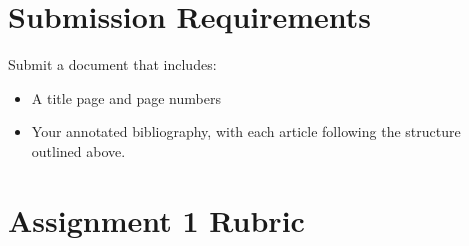 \documentclass[
  letterpaper,
  DIV=11,
  numbers=noendperiod]{scrreprt}
\providecommand{\tightlist}{%
  \setlength{\itemsep}{0pt}\setlength{\parskip}{0pt}}\usepackage{longtable,booktabs,array}
\begin{document}
\section{Submission Requirements}\label{submission-requirements}

Submit a document that includes:

\begin{itemize}
\tightlist
\item
  A title page and page numbers
\item
  Your annotated bibliography, with each article following the structure
  outlined above.
\end{itemize}

\section{Assignment 1 Rubric}\label{assignment-1-rubric}
\end{document}
